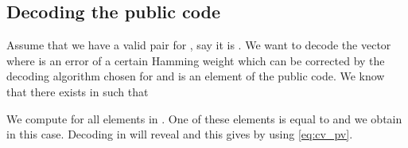 \documentclass[runningheads,11pt]{llncs}
\begin{document}
\subsection{Decoding the public code}\label{ss:breaking_Baldi}

Assume that we have a valid  pair for , say it is .
We want to decode the vector  where  is an error of a certain Hamming weight which 
can be corrected by the decoding algorithm chosen for  and  is an element of the public code. We know that there exists 
 in  such that 

We compute  for all elements 
 in . One of these elements  is equal to   and 
we obtain  in this case. Decoding  in  will reveal  and
this gives  by using \eqref{eq:cv_pv}.

 
\end{document}
